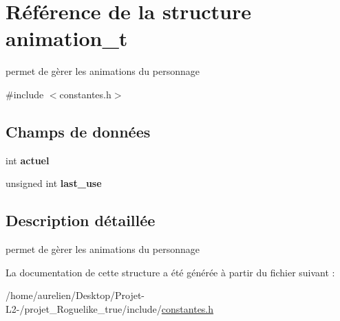 \hypertarget{structanimation__t}{}\section{Référence de la structure animation\+\_\+t}
\label{structanimation__t}


permet de gèrer les animations du personnage  




{\ttfamily \#include $<$constantes.\+h$>$}

\subsection*{Champs de données}
\begin{DoxyCompactItemize}
\item 
\mbox{\label{structanimation__t_a4f59d14b31d468b5d5c6c7ab6e76d496}} 
int {\bfseries actuel}
\item 
\mbox{\label{structanimation__t_a4e52328888b9e25b64b883ff7d1a66e3}} 
unsigned int {\bfseries last\+\_\+use}
\end{DoxyCompactItemize}


\subsection{Description détaillée}
permet de gèrer les animations du personnage 

La documentation de cette structure a été générée à partir du fichier suivant \+:\begin{DoxyCompactItemize}
\item 
/home/aurelien/\+Desktop/\+Projet-\/\+L2-\//projet\+\_\+\+Roguelike\+\_\+true/include/\hyperlink{constantes_8h}{constantes.\+h}\end{DoxyCompactItemize}
